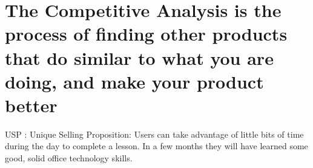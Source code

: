 \section{The Competitive Analysis is the process of finding other products that do similar to what you are doing, and make your product better}

USP : Unique Selling Proposition: Users can take advantage of little bits of time during the day to complete a lesson. In a few months they will have learned some good, solid office technology skills.